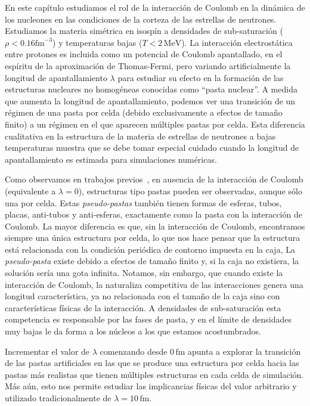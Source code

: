 En este capítulo estudiamos el rol de la interacción de Coulomb en la dinámica de los nucleones en las condiciones de la corteza de las estrellas de neutrones.
Estudiamos la materia simétrica en isospín a densidades de sub-saturación ($\rho < 0.16\text{fm}^{-3}$) y temperaturas bajas ($T < 2\,\text{MeV}$).
La interacción electrostática entre protones es incluida como un potencial de Coulomb apantallado, en el espíritu de la aproximación de Thomas-Fermi, pero variando artificialmente la longitud de apantallamiento $\lambda$ para estudiar su efecto en la formación de las estructuras nucleares no homogéneas conocidas como ``pasta nuclear''.
A medida que aumenta la longitud de apantallamiento, podemos ver una transición de un régimen de una pasta por celda (debido exclusivamente a efectos de tamaño finito) a un régimen en el que aparecen múltiples pastas por celda.
Esta diferencia cualitativa en la estructura de la materia de estrellas de neutrones a bajas temperaturas muestra que se debe tomar especial cuidado cuando la longitud de apantallamiento es estimada para simulaciones numéricas.

Como observamos en trabajos previos~\cite{schneider_nuclear_2013,gimenez_molinelli_simulations_2014}, en ausencia de la interacción de Coulomb (equivalente a $\lambda=0$), estructuras tipo pastas pueden ser observadas, aunque sólo una por celda.
Estas \emph{pseudo-pastas} también tienen formas de esferas, tubos, placas, anti-tubos y anti-esferas, exactamente como la pasta con la interacción de Coulomb.
La mayor diferencia es que, sin la interacción de Coulomb, encontramos siempre una única estructura por celda, lo que nos hace pensar que la estructura está relacionada con la condición periódica de contorno impuesta en la caja,
La \emph{pseudo-pasta} existe debido a efectos de tamaño finito y, si la caja no existiera, la solución sería una gota infinita.
Notamos, sin embargo, que cuando existe la interacción de Coulomb, la naturaliza competitiva de las interacciones genera una longitud característica, ya no relacionada con el tamaño de la caja sino con características físicas de la interacción.
A densidades de sub-saturación esta competencia es responsable por las fases de pasta, y en el límite de densidades muy bajas le da forma a los núcleos a los que estamos acostumbrados.

Incrementar el valor de $\lambda$ comenzando desde $0\,\text{fm}$ apunta a explorar la transición de las pastas artificiales en las que se produce una estructura por celda hacia las pastas más realistas que tienen múltiples estructuras en cada celda de simulación.
Más aún, esto nos permite estudiar las implicancias físicas del valor arbitrario y utilizado tradicionalmente de $\lambda=10\,\text{fm}$.

